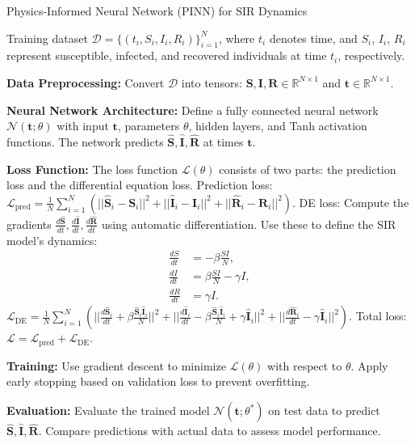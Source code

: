 \documentclass[12pt]{article}
\begin{document}
\begin{algorithm}
\caption{Physics-Informed Neural Network (PINN) for SIR Dynamics}
\begin{algorithmic}[1]

\Require Training dataset $\mathcal{D} = \{(t_i, S_i, I_i, R_i)\}_{i=1}^{N}$, where $t_i$ denotes time, and $S_i$, $I_i$, $R_i$ represent susceptible, infected, and recovered individuals at time $t_i$, respectively.

\State \textbf{Data Preprocessing:}
\State Convert $\mathcal{D}$ into tensors: $\mathbf{S}, \mathbf{I}, \mathbf{R} \in \mathbb{R}^{N \times 1}$ and $\mathbf{t} \in \mathbb{R}^{N \times 1}$.

\State \textbf{Neural Network Architecture:}
\State Define a fully connected neural network $\mathcal{N}(\mathbf{t}; \theta)$ with input $\mathbf{t}$, parameters $\theta$, hidden layers, and Tanh activation functions. The network predicts $\hat{\mathbf{S}}, \hat{\mathbf{I}}, \hat{\mathbf{R}}$ at times $\mathbf{t}$.

\State \textbf{Loss Function:}
\State The loss function $\mathcal{L}(\theta)$ consists of two parts: the prediction loss and the differential equation loss.
\State Prediction loss: $\mathcal{L}_{\text{pred}} = \frac{1}{N}\sum_{i=1}^{N} \left( ||\hat{\mathbf{S}}_i - \mathbf{S}_i||^2 + ||\hat{\mathbf{I}}_i - \mathbf{I}_i||^2 + ||\hat{\mathbf{R}}_i - \mathbf{R}_i||^2 \right)$.
\State DE loss: Compute the gradients $\frac{d\hat{\mathbf{S}}}{dt}, \frac{d\hat{\mathbf{I}}}{dt}, \frac{d\hat{\mathbf{R}}}{dt}$ using automatic differentiation. Use these to define the SIR model's dynamics:
\begin{align*}
\frac{dS}{dt} &= -\beta \frac{SI}{N}, \\
\frac{dI}{dt} &= \beta \frac{SI}{N} - \gamma I, \\
\frac{dR}{dt} &= \gamma I.
\end{align*}
\State $\mathcal{L}_{\text{DE}} = \frac{1}{N}\sum_{i=1}^{N} \left( ||\frac{d\hat{\mathbf{S}}_i}{dt} + \beta \frac{\hat{\mathbf{S}}_i \hat{\mathbf{I}}_i}{N}||^2 + ||\frac{d\hat{\mathbf{I}}_i}{dt} - \beta \frac{\hat{\mathbf{S}}_i \hat{\mathbf{I}}_i}{N} + \gamma \hat{\mathbf{I}}_i||^2 + ||\frac{d\hat{\mathbf{R}}_i}{dt} - \gamma \hat{\mathbf{I}}_i||^2 \right)$.
\State Total loss: $\mathcal{L} = \mathcal{L}_{\text{pred}} + \mathcal{L}_{\text{DE}}$.

\State \textbf{Training:}
\State Use gradient descent to minimize $\mathcal{L}(\theta)$ with respect to $\theta$.
\State Apply early stopping based on validation loss to prevent overfitting.

\State \textbf{Evaluation:}
\State Evaluate the trained model $\mathcal{N}(\mathbf{t}; \theta^*)$ on test data to predict $\hat{\mathbf{S}}, \hat{\mathbf{I}}, \hat{\mathbf{R}}$.
\State Compare predictions with actual data to assess model performance.

\end{algorithmic}
\end{algorithm}
\end{document}
